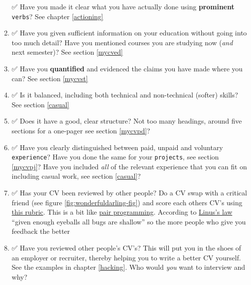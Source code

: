 \documentclass[
]{book}
\begin{document}
\begin{enumerate}
  ✅ Have you made it clear what you have actually done using \textbf{prominent} \texttt{verbs}? See chapter \ref{actioning}
\item
  ✅ Have you given sufficient information on your education without going into too much detail? Have you mentioned courses you are studying now (\emph{and} next semester)? See section \ref{mycved}
\item
  ✅ Have you \textbf{quantified} and evidenced the claims you have made where you can? See section \ref{mycvst}
\item
  ✅ Is it balanced, including both technical and non-technical (softer) skills? See section \ref{casual}
\item
  ✅ Does it have a good, clear structure? Not too many headings, around five sections for a one-pager see section \ref{mycvpd}?
\item
  ✅ Have you clearly distinguished between paid, unpaid and voluntary \texttt{experience}? Have you done the same for your \texttt{projects}, see section \ref{mycvpj}? Have you included \emph{all} of the relevant experience that you can fit on including casual work, see section \ref{casual}?
\item
  ✅ Has your CV been reviewed by other people? Do a CV swap with a critical friend (see figure \ref{fig:wonderfuldarling-fig}) and score each others CV's using \href{https://www.cdyf.me/CV-rubric.pdf}{this rubric}. This is a bit like \href{https://en.wikipedia.org/wiki/Pair_programming}{pair programming}. According to \href{https://en.wikipedia.org/wiki/Linus\%27s_law}{Linus's law} ``given enough eyeballs all bugs are shallow'' \citep{Raymond1999} so the more people who give you feedback the better
\item
  ✅ Have you reviewed other people's CV's? This will put you in the shoes of an employer or recruiter, thereby helping you to write a better CV yourself. See the examples in chapter \ref{hacking}. Who would \emph{you} want to interview and why?
\end{enumerate}
\end{document}
